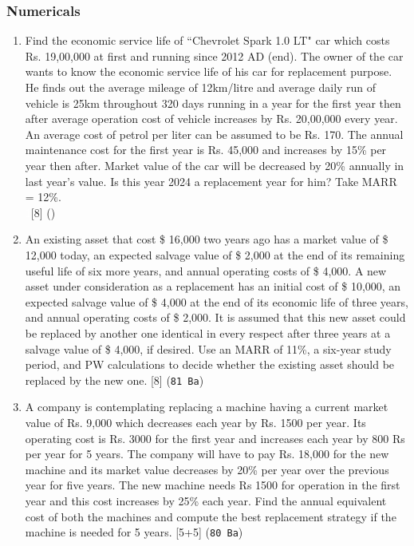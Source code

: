 \documentclass[12pt]{article}
\newcommand{\enter}{\\\textcolor{white}{1}}
\begin{document}
		\subsubsection{Numericals}
			\begin{enumerate}
				\item Find the economic service life of ``Chevrolet Spark 1.0 LT" car which costs Rs. 19,00,000 at first and running since 2012 AD (end). The owner of the car wants to know the economic service life of his car for replacement purpose. He finds out the average mileage of 12km/litre and average daily run of vehicle is 25km throughout 320 days running in a year for the first year then after average operation cost of vehicle increases by Rs. 20,00,000 every year. An average cost of petrol per liter can be assumed to be Rs. 170. The annual maintenance cost for the first year is Rs. 45,000 and increases by 15\% per year then after. Market value of the car will be decreased by 20\% annually in last year's value. Is this year 2024 a replacement year for him? Take MARR = 12\%. 
				\enter\hfill [8] ()

				\item An existing asset that cost \$ 16,000 two years ago has a market value of \$ 12,000 today, an expected salvage value of \$ 2,000 at the end of its remaining useful life of six more years, and annual operating costs of \$ 4,000. A new asset under consideration as a replacement has an initial cost of \$ 10,000, an expected salvage value of \$ 4,000 at the end of its economic life of three years, and annual operating costs of \$ 2,000. It is assumed that this new asset could be replaced by another one identical in every respect after three years at a salvage value of \$ 4,000, if desired. Use an MARR of 11\%, a six-year study period, and PW calculations to decide whether the existing asset should be replaced by the new one. \hfill [8] (\texttt{81 Ba})

				\item A company is contemplating replacing a machine having a current market value of Rs. 9,000 which decreases each year by Rs. 1500 per year. Its operating cost is Rs. 3000 for the first year and increases each year by 800 Rs per year for 5 years. The company will have to pay Rs. 18,000 for the new machine and its market value decreases by 20\% per year over the previous year for five years. The new machine needs Rs 1500 for operation in the first year and this cost increases by 25\% each year. Find the annual equivalent cost of both the machines and compute the best replacement strategy if the machine is needed for 5 years. \hfill [5+5] (\texttt{80 Ba})


\end{enumerate}
\end{document}
